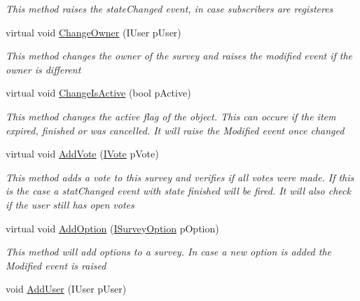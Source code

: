 \begin{DoxyCompactItemize}
\begin{DoxyCompactList}\small\item\em This method raises the state\+Changed event, in case subscribers are registeres \end{DoxyCompactList}\item 
virtual void \hyperlink{class_plex_byte_1_1_mo_cap_1_1_interactions_1_1_survey_a1c301916ee78db1236c465cd3fe40449}{Change\+Owner} (I\+User p\+User)
\begin{DoxyCompactList}\small\item\em This method changes the owner of the survey and raises the modified event if the owner is different \end{DoxyCompactList}\item 
virtual void \hyperlink{class_plex_byte_1_1_mo_cap_1_1_interactions_1_1_survey_ab51b78828fafe0eaa305d6c80df91b0f}{Change\+Is\+Active} (bool p\+Active)
\begin{DoxyCompactList}\small\item\em This method changes the active flag of the object. This can occure if the item expired, finished or was cancelled. It will raise the Modified event once changed \end{DoxyCompactList}\item 
virtual void \hyperlink{class_plex_byte_1_1_mo_cap_1_1_interactions_1_1_survey_a0dcd8382de2ee659237dc0b25a388256}{Add\+Vote} (\hyperlink{interface_plex_byte_1_1_mo_cap_1_1_interactions_1_1_i_vote}{I\+Vote} p\+Vote)
\begin{DoxyCompactList}\small\item\em This method adds a vote to this survey and verifies if all votes were made. If this is the case a stat\+Changed event with state finished will be fired. It will also check if the user still has open votes \end{DoxyCompactList}\item 
virtual void \hyperlink{class_plex_byte_1_1_mo_cap_1_1_interactions_1_1_survey_a0a19d3bd2f79e716f256a76faeb850bc}{Add\+Option} (\hyperlink{interface_plex_byte_1_1_mo_cap_1_1_interactions_1_1_i_survey_option}{I\+Survey\+Option} p\+Option)
\begin{DoxyCompactList}\small\item\em This method will add options to a survey. In case a new option is added the Modified event is raised \end{DoxyCompactList}\item 
void \hyperlink{class_plex_byte_1_1_mo_cap_1_1_interactions_1_1_survey_a72758296f5dbc1e2f197705d51e1a827}{Add\+User} (I\+User p\+User)

\end{DoxyCompactItemize}
